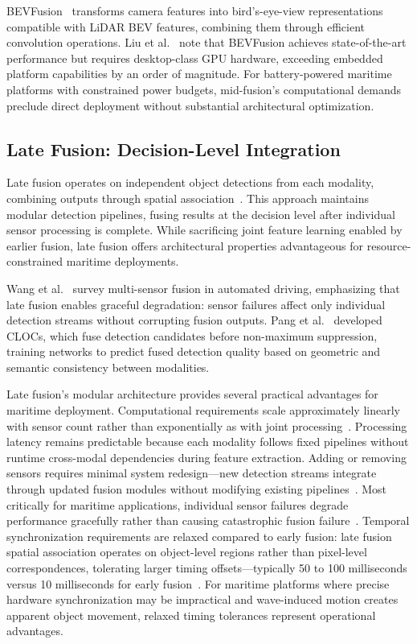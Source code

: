 \documentclass{erauthesis}
\begin{document}
BEVFusion~\cite{liang2022, liu2023b} transforms camera features into bird's-eye-view representations compatible with \ac{LiDAR} BEV features, combining them through efficient convolution operations.
Liu et al.~\cite{liu2023b} note that BEVFusion achieves state-of-the-art performance but requires desktop-class GPU hardware, exceeding embedded platform capabilities by an order of magnitude.
For battery-powered maritime platforms with constrained power budgets, mid-fusion's computational demands preclude direct deployment without substantial architectural optimization.

\subsection{Late Fusion: Decision-Level Integration}

Late fusion operates on independent object detections from each modality, combining outputs through spatial association~\cite{wang2020a, pang2020}.
This approach maintains modular detection pipelines, fusing results at the decision level after individual sensor processing is complete.
While sacrificing joint feature learning enabled by earlier fusion, late fusion offers architectural properties advantageous for resource-constrained maritime deployments.

Wang et al.~\cite{wang2020a} survey multi-sensor fusion in automated driving, emphasizing that late fusion enables graceful degradation: sensor failures affect only individual detection streams without corrupting fusion outputs.
Pang et al.~\cite{pang2020} developed CLOCs, which fuse detection candidates before non-maximum suppression, training networks to predict fused detection quality based on geometric and semantic consistency between modalities.

Late fusion's modular architecture provides several practical advantages for maritime deployment.
Computational requirements scale approximately linearly with sensor count rather than exponentially as with joint processing~\cite{wang2020a}.
Processing latency remains predictable because each modality follows fixed pipelines without runtime cross-modal dependencies during feature extraction.
Adding or removing sensors requires minimal system redesign—new detection streams integrate through updated fusion modules without modifying existing pipelines~\cite{feng2021}.
Most critically for maritime applications, individual sensor failures degrade performance gracefully rather than causing catastrophic fusion failure~\cite{huang2024a}.
Temporal synchronization requirements are relaxed compared to early fusion: late fusion spatial association operates on object-level regions rather than pixel-level correspondences, tolerating larger timing offsets—typically 50 to 100 milliseconds versus 10 milliseconds for early fusion~\cite{huang2024a}.
For maritime platforms where precise hardware synchronization may be impractical and wave-induced motion creates apparent object movement, relaxed timing tolerances represent operational advantages.
\end{document}
